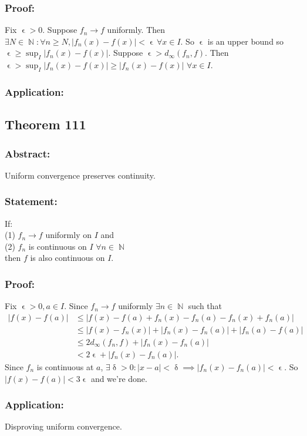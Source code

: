 \documentclass{article}
\DeclareMathOperator\eps{\epsilon}
\DeclareMathOperator\del{\delta}
\DeclareMathOperator\N{\mathbb{N}}
\begin{document}
\subsubsection*{Proof:}
Fix $\eps>0$. Suppose $f_n \to f$ uniformly. Then $\exists N \in \N: \forall n \geq N, |f_n(x)-f(x)|<\eps \, \forall x \in I$.
So $\eps$ is an upper bound so $\eps \geq \sup_I|f_n(x)-f(x)|$. Suppose $\eps>d_{\infty}(f_n,f)$. Then
$\eps > \sup_I|f_n(x)-f(x)| \geq |f_n(x)-f(x)|\,\, \forall x \in I$.
\subsubsection*{Application:}
\subsection{Theorem 111}
\subsubsection*{Abstract:}
Uniform convergence preserves continuity.
\subsubsection*{Statement:}
If: \\
\newline
(1) $f_n \to f$ uniformly on $I$ and \\
\newline
(2) $f_n$ is continuous on $I$ $\forall n \in \N$ \\
\newline
then $f$ is also continuous on $I$.
\subsubsection*{Proof:}
Fix $\eps>0, a \in I$. Since $f_n \to f$ uniformly $\exists n \in \N$ such that
\begin{align*}
|f(x)-f(a)| &\leq |f(x)-f(a)+f_n(x)-f_n(a)-f_n(x)+f_n(a)| \\
& \leq |f(x)-f_n(x)|+|f_n(x)-f_n(a)|+|f_n(a)-f(a)| \\
& \leq 2d_{\infty}(f_n,f)+|f_n(x)-f_n(a)| \\
& < 2 \eps + |f_n(x)-f_n(a)|.
\end{align*}
Since $f_n$ is continuous at $a$, $\exists \del>0:|x-a|< \del \implies |f_n(x)-f_n(a)| < \eps$.
So $|f(x)-f(a)| < 3\eps$ and we're done.
\subsubsection*{Application:}
Disproving uniform convergence.
\end{document}
